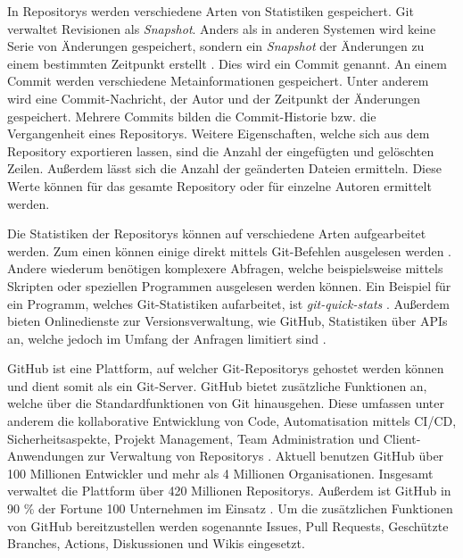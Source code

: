 In Repositorys werden verschiedene Arten von Statistiken gespeichert.
Git verwaltet Revisionen als \emph{Snapshot}.
Anders als in anderen Systemen wird keine Serie von Änderungen gespeichert, sondern ein \emph{Snapshot} der Änderungen zu einem bestimmten Zeitpunkt erstellt \autocite{ponuthorai_version_2022}.
Dies wird ein Commit genannt.
An einem Commit werden verschiedene Metainformationen gespeichert.
Unter anderem wird eine Commit-Nachricht, der Autor und der Zeitpunkt der Änderungen gespeichert.
Mehrere Commits bilden die Commit-Historie bzw. die Vergangenheit eines Repositorys.
Weitere Eigenschaften, welche sich aus dem Repository exportieren lassen, sind die Anzahl der eingefügten und gelöschten Zeilen.
Außerdem lässt sich die Anzahl der geänderten Dateien ermitteln.
Diese Werte können für das gesamte Repository oder für einzelne Autoren ermittelt werden.

Die Statistiken der Repositorys können auf verschiedene Arten aufgearbeitet werden.
Zum einen können einige direkt mittels Git-Befehlen ausgelesen werden \autocite{chacon_git_2024}.
Andere wiederum benötigen komplexere Abfragen, welche beispielsweise mittels Skripten oder speziellen Programmen ausgelesen werden können.
Ein Beispiel für ein Programm, welches Git-Statistiken aufarbeitet, ist \emph{git-quick-stats} \autocite{mestan_git-quick-stats_2024}.
Außerdem bieten Onlinedienste zur Versionsverwaltung, wie GitHub, Statistiken über APIs an, welche jedoch im Umfang der Anfragen limitiert sind \autocite{github_rate_2022}.

GitHub ist eine Plattform, auf welcher Git-Repositorys gehostet werden können und dient somit als ein Git-Server.
GitHub bietet zusätzliche Funktionen an, welche über die Standardfunktionen von Git hinausgehen.
Diese umfassen unter anderem die kollaborative Entwicklung von Code, Automatisation mittels CI/CD, Sicherheitsaspekte, Projekt Management, Team Administration und Client-Anwendungen zur Verwaltung von Repositorys \autocite{ponuthorai_version_2022}.
Aktuell benutzen GitHub über 100 Millionen Entwickler und mehr als 4 Millionen Organisationen.
Insgesamt verwaltet die Plattform über 420 Millionen Repositorys.
Außerdem ist GitHub in 90 \% der Fortune 100 Unternehmen im Einsatz \autocite{github_about_2024}.
Um die zusätzlichen Funktionen von GitHub bereitzustellen werden sogenannte Issues, Pull Requests, Geschützte Branches, Actions, Diskussionen und Wikis eingesetzt.

